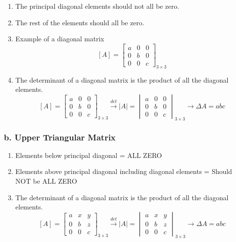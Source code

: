 \begin{enumerate}
    \item The principal diagonal elements should not all be zero.

    \item The rest of the elements should all be zero.

    \item Example of a diagonal matrix
    $$  [A] = \begin{bmatrix}
        a & 0 & 0 \\
        0 & b & 0 \\
        0 & 0 & c
        \end{bmatrix}_{3 \times 3}
    $$

    \item The determinant of a diagonal matrix is the product of all the diagonal elements.
    $$  [A] = \begin{bmatrix}
        a & 0 & 0 \\
        0 & b & 0 \\
        0 & 0 & c
        \end{bmatrix}_{3 \times 3} \xrightarrow{det}
        |A| = \begin{vmatrix}
        a & 0 & 0 \\
        0 & b & 0 \\
        0 & 0 & c
        \end{vmatrix}_{3 \times 3} \xrightarrow{}
        \Delta A = abc
    $$
\end{enumerate}

\subsubsection*{b. Upper Triangular Matrix}

\begin{enumerate}
    \item Elements below principal diagonal = ALL ZERO

    \item Elements above principal diagonal including diagonal elements = Should NOT be ALL ZERO

    \item The determinant of a diagonal matrix is the product of all the diagonal elements.
    $$  [A] = \begin{bmatrix}
        a & x & y \\
        0 & b & z \\
        0 & 0 & c
        \end{bmatrix}_{3 \times 3} \xrightarrow{det}
        |A| = \begin{vmatrix}
        a & x & y \\
        0 & b & z \\
        0 & 0 & c
        \end{vmatrix}_{3 \times 3} \xrightarrow{}
        \Delta A = abc
    $$
\end{enumerate}

